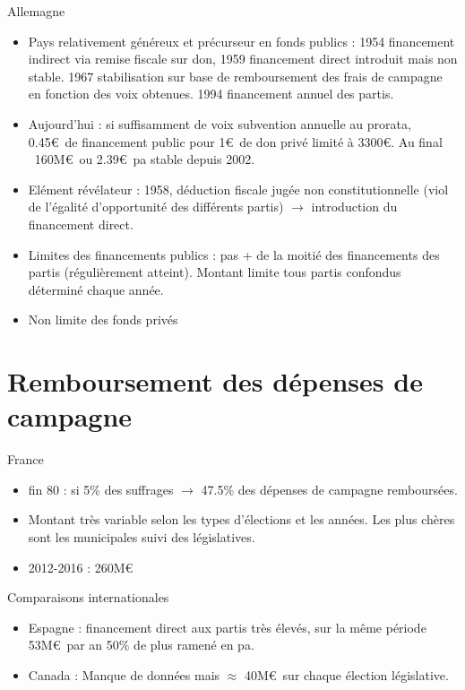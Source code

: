 \documentclass[10pt,t]{beamer}
\begin{document}
\begin{frame}{Allemagne}
    \begin{itemize}
        \item  \alert{Pays relativement généreux et précurseur en fonds publics} : 1954 financement indirect via remise fiscale sur don, 1959 financement direct introduit mais non stable. 1967 stabilisation sur base de remboursement des frais de campagne en fonction des voix obtenues. 1994 financement annuel des partis.
        \item \alert{Aujourd'hui} : si suffisamment de voix subvention annuelle au prorata, 0.45\euro\ de financement public pour 1\euro\ de don privé limité à 3300\euro. Au final ~160M\euro\ ou 2.39\euro\ pa stable depuis 2002.
        \item \alert{Elément révélateur} : 1958, déduction fiscale jugée non constitutionnelle (viol de l'égalité d'opportunité des différents partis) $\rightarrow$ introduction du financement direct.
        \item  \alert{Limites des financements publics} : pas + de la moitié des financements des partis (régulièrement atteint). Montant limite tous partis confondus déterminé chaque année.
        \item \alert{Non limite} des fonds privés
    \end{itemize}
\end{frame}

\section{Remboursement des dépenses de campagne}
\begin{frame}{France}
    \begin{itemize}
        \item \alert{fin 80} : si 5\% des suffrages $\rightarrow$ 47.5\% des dépenses de campagne remboursées.
        \item Montant très variable selon les types d'élections et les années. Les plus chères sont les municipales suivi des législatives.
        \item \alert{2012-2016} : 260M\euro\ 
    \end{itemize}
\end{frame}

\begin{frame}{Comparaisons internationales}
    \begin{itemize}
        \item \alert{Espagne} : financement direct aux partis très élevés, sur la même période 53M\euro\ par an 50\% de plus ramené en pa.
        \item \alert{Canada} : Manque de données mais $\approx$ 40M\euro\ sur chaque élection législative.
    \end{itemize}
\end{frame}
\end{document}
